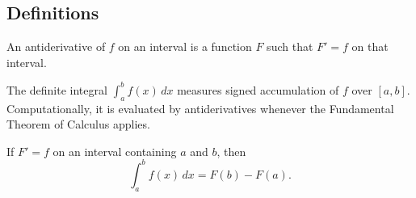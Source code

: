 \subsection*{Definitions}

\begin{definition*}[Antiderivative]
An antiderivative of \(f\) on an interval is a function \(F\) such that
\(F'=f\) on that interval.
\end{definition*}

\begin{definition*}
The definite integral \(\int_a^b f(x)\,dx\) measures signed accumulation of
\(f\) over \([a,b]\). Computationally, it is evaluated by antiderivatives
whenever the Fundamental Theorem of Calculus applies.
\end{definition*}

\begin{theorem*}
If \(F'=f\) on an interval containing \(a\) and \(b\), then
\[
  \int_a^b f(x)\,dx = F(b)-F(a).
\]
\end{theorem*}
